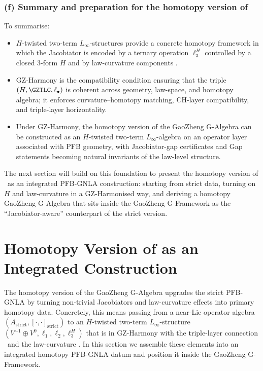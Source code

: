 \documentclass[11pt]{book}
\theoremstyle{plain}
\theoremstyle{definition}
\begin{document}
\subsubsection*{(f) Summary and preparation for the homotopy version of \texorpdfstring{\GAlgebra}{G-Algebra}}

To summarise:

\begin{itemize}
  \item $H$-twisted two-term $L_\infty$-structures provide a concrete
        homotopy framework in which the Jacobiator is encoded by a
        ternary operation $\ell_3^H$ controlled by a closed 3-form $H$
        and by law-curvature components \GZLCurv.
  \item GZ-Harmony is the compatibility condition ensuring that the
        triple $(H,\GZTLC,\ell_\bullet)$ is coherent across geometry,
        law-space, and homotopy algebra; it enforces curvature–homotopy
        matching, CH-layer compatibility, and triple-layer horizontality.
  \item Under GZ-Harmony, the homotopy version of the GaoZheng
        G-Algebra can be constructed as an $H$-twisted two-term
        $L_\infty$-algebra on an operator layer associated with
        PFB geometry, with Jacobiator-gap certificates and Gap
        statements becoming natural invariants of the law-level
        structure.
\end{itemize}

The next section will build on this foundation to present the homotopy
version of \GAlgebra\ as an integrated PFB-GNLA construction: starting
from strict data, turning on $H$ and law-curvature in a GZ-Harmonised
way, and deriving a homotopy GaoZheng G-Algebra that sits inside the
GaoZheng G-Framework as the “Jacobiator-aware” counterpart of the
strict version.



\section[Homotopy Version of the G-Algebra: Integrated Construction]{Homotopy Version of \GAlgebra as an Integrated Construction}


The homotopy version of the GaoZheng G-Algebra upgrades the strict
PFB-GNLA by turning non-trivial Jacobiators and law-curvature effects
into primary homotopy data. Concretely, this means passing from a
near-Lie operator algebra $(A_{\mathrm{strict}},[\cdot,\cdot]_{\mathrm{strict}})$
to an $H$-twisted two-term $L_\infty$-structure
$(V^{-1}\oplus V^0,\ell_1,\ell_2,\ell_3^H)$ that is in GZ-Harmony with
the triple-layer connection \GZTLC\ and the law-curvature \GZLCurv. In
this section we assemble these elements into an integrated homotopy
PFB-GNLA datum and position it inside the GaoZheng G-Framework.
\end{document}
